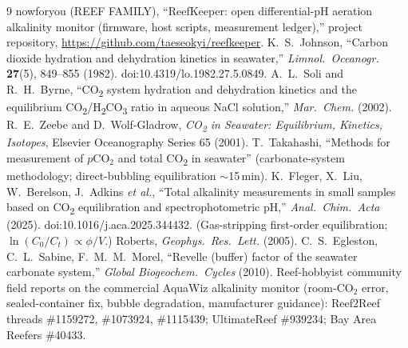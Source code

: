 \documentclass[11pt]{article}
\newcommand{\co}{\ensuremath{\mathrm{CO_2}}}
\begin{document}
\begin{thebibliography}{9}
 nowforyou (REEF FAMILY), ``ReefKeeper: open differential-pH
aeration alkalinity monitor (firmware, host scripts, measurement ledger),''
project repository, \url{https://github.com/taeseokyi/reefkeeper}.
 K.~S.~Johnson, ``Carbon dioxide hydration and dehydration
kinetics in seawater,'' \emph{Limnol.\ Oceanogr.} \textbf{27}(5), 849--855
(1982). doi:10.4319/lo.1982.27.5.0849.
 A.~L.~Soli and R.~H.~Byrne, ``CO\textsubscript{2} system
hydration and dehydration kinetics and the equilibrium CO\textsubscript{2}/H\textsubscript{2}CO\textsubscript{3}
ratio in aqueous NaCl solution,'' \emph{Mar.\ Chem.} (2002).
 R.~E.~Zeebe and D.~Wolf-Gladrow, \emph{CO\textsubscript{2}
in Seawater: Equilibrium, Kinetics, Isotopes}, Elsevier Oceanography Series 65
(2001).
 T.~Takahashi, ``Methods for measurement of
$p\mathrm{CO_2}$ and total CO\textsubscript{2} in seawater'' (carbonate-system
methodology; direct-bubbling equilibration $\sim$15\,min).
 K.~Fleger, X.~Liu, W.~Berelson, J.~Adkins \emph{et al.},
``Total alkalinity measurements in small samples based on
CO\textsubscript{2} equilibration and spectrophotometric pH,''
\emph{Anal.\ Chim.\ Acta} (2025). doi:10.1016/j.aca.2025.344432.
 (Gas-stripping first-order equilibration;
$\ln(C_0/C_t)\propto \phi/V$.) Roberts, \emph{Geophys.\ Res.\ Lett.} (2005).
 C.~S.~Egleston, C.~L.~Sabine, F.~M.~M.~Morel,
``Revelle (buffer) factor of the seawater carbonate system,''
\emph{Global Biogeochem.\ Cycles} (2010).
 Reef-hobbyist community field reports on the commercial
AquaWiz alkalinity monitor (room-\co{} error, sealed-container fix, bubble
degradation, manufacturer guidance): Reef2Reef threads \#1159272, \#1073924,
\#1115439; UltimateReef \#939234; Bay Area Reefers \#40433.
\end{thebibliography}
\end{document}
